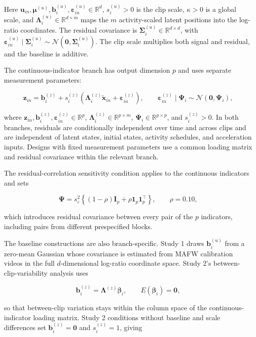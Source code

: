\documentclass[
]{article}
\begin{document}
Here
\(\mathbf u_{in},\boldsymbol\mu^{(u)},\mathbf b_i^{(u)},\boldsymbol\varepsilon_{in}^{(u)}\in\mathbb R^d\),
\(s_i^{(u)}>0\) is the clip scale, \(\kappa>0\) is a global scale, and
\(\boldsymbol\Lambda_i^{(u)}\in\mathbb R^{d\times m}\) maps the \(m\)
activity-scaled latent positions into the log-ratio coordinates. The
residual covariance is
\(\boldsymbol\Sigma_i^{(u)}\in\mathbb R^{d\times d}\), with
\(\boldsymbol\varepsilon_{in}^{(u)}\mid\boldsymbol\Sigma_i^{(u)}\sim\mathcal N(\mathbf 0,\boldsymbol\Sigma_i^{(u)})\).
The clip scale multiplies both signal and residual, and the baseline is
additive.

The continuous-indicator branch has output dimension \(p\) and uses
separate measurement parameters:

\[
\mathbf z_{in}
=
\mathbf b_i^{(z)}
+s_i^{(z)}
\left(
\boldsymbol\Lambda_i^{(z)}\tilde{\mathbf x}_{in}
+\boldsymbol\varepsilon_{in}^{(z)}
\right),
\qquad
\boldsymbol\varepsilon_{in}^{(z)}\mid\boldsymbol\Psi_i
\sim\mathcal N(\mathbf 0,\boldsymbol\Psi_i),
\]

where
\(\mathbf z_{in},\mathbf b_i^{(z)},\boldsymbol\varepsilon_{in}^{(z)}\in\mathbb R^p\),
\(\boldsymbol\Lambda_i^{(z)}\in\mathbb R^{p\times m}\),
\(\boldsymbol\Psi_i\in\mathbb R^{p\times p}\), and \(s_i^{(z)}>0\). In
both branches, residuals are conditionally independent over time and
across clips and are independent of latent states, initial states,
activity schedules, and acceleration inputs. Designs with fixed
measurement parameters use a common loading matrix and residual
covariance within the relevant branch.

The residual-correlation sensitivity condition applies to the continuous
indicators and sets

\[
\boldsymbol\Psi
=s_\varepsilon^2
\left\{(1-\rho)\mathbf I_p
+\rho\mathbf 1_p\mathbf 1_p^\top\right\},
\qquad \rho=0.10,
\]

which introduces residual covariance between every pair of the \(p\)
indicators, including pairs from different prespecified blocks.

The baseline constructions are also branch-specific. Study 1 draws
\(\mathbf b_i^{(u)}\) from a zero-mean Gaussian whose covariance is
estimated from MAFW calibration videos in the full \(d\)-dimensional
log-ratio coordinate space. Study 2's between-clip-variability analysis
uses

\[
\mathbf b_i^{(z)}
=\boldsymbol\Lambda^{(z)}\boldsymbol\beta_i,
\qquad E(\boldsymbol\beta_i)=\mathbf 0,
\]

so that between-clip variation stays within the column space of the
continuous-indicator loading matrix. Study 2 conditions without baseline
and scale differences set \(\mathbf b_i^{(z)}=\mathbf 0\) and
\(s_i^{(z)}=1\), giving
\end{document}

